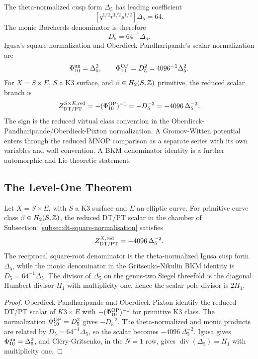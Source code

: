 The theta-normalized cusp form \(\Delta_5\) has leading coefficient
\[
        [q^{1/2}r^{1/2}s^{1/2}]\Delta_5=64 .
\]
The monic Borcherds denominator is therefore
\[
        D_5=64^{-1}\Delta_5 .
\]
Igusa's square normalization and Oberdieck-Pandharipande's scalar
normalization are
\[
        \Phi_{10}^{\mathrm{un}}=\Delta_5^2,\qquad
        \Phi_{10}^{\mathrm{OP}}=D_5^2=4096^{-1}\Delta_5^2 .
\]
For \(X=S\times E\), \(S\) a K3 surface, and \(\beta\in H_2(S,\mathbb{Z})\)
primitive, the reduced scalar branch is
\[
        Z^{S\times E,\mathrm{red}}_{\mathrm{DT}/\mathrm{PT}}
        =
        -(\Phi_{10}^{\mathrm{OP}})^{-1}
        =
        -D_5^{-2}
        =
        -4096\,\Delta_5^{-2}.
\]
The sign is the reduced virtual class convention in the
Oberdieck-Pandharipande/Oberdieck-Pixton normalization.  A
Gromov-Witten potential enters through the reduced MNOP comparison as a
separate series with its own variables and wall convention.  A BKM
denominator identity is a further automorphic and Lie-theoretic
statement.

\subsection{The Level-One Theorem}
\label{subsec:level-one-theorem}

\begin{theorem}
\label{thm:reduced-k3e-delta5-square}
Let \(X=S\times E\), with \(S\) a K3 surface and \(E\) an elliptic
curve.  For primitive curve class \(\beta\in H_2(S,\mathbb{Z})\), the reduced
DT/PT scalar in the chamber of
Subsection~\ref{subsec:dt-square-normalisation} satisfies
\[
        Z^{X,\mathrm{red}}_{\mathrm{DT}/\mathrm{PT}}
        =
        -4096\,\Delta_5^{-2}.
\]
The reciprocal square-root denominator is the theta-normalized Igusa
cusp form \(\Delta_5\), while the monic denominator in the
Gritsenko-Nikulin BKM identity is \(D_5=64^{-1}\Delta_5\).  The divisor
of \(\Delta_5\) on the genus-two Siegel threefold is the diagonal
Humbert divisor \(H_1\) with multiplicity one, hence the scalar pole
divisor is \(2H_1\).
\end{theorem}

\begin{proof}
Oberdieck-Pandharipande and Oberdieck-Pixton identify the reduced
DT/PT scalar of \(K3\times E\) with
\(-(\Phi_{10}^{\mathrm{OP}})^{-1}\) for primitive K3 class.  The
normalization
\(\Phi_{10}^{\mathrm{OP}}=D_5^2\) gives \(-D_5^{-2}\).  The
theta-normalized and monic products are related by
\(D_5=64^{-1}\Delta_5\), so the scalar becomes
\(-4096\,\Delta_5^{-2}\).  Igusa gives
\(\Phi_{10}^{\mathrm{un}}=\Delta_5^2\), and
Cl\'ery-Gritsenko, in the \(N=1\) row, gives
\(\operatorname{div}(\Delta_5)=H_1\) with multiplicity one.
\end{proof}

